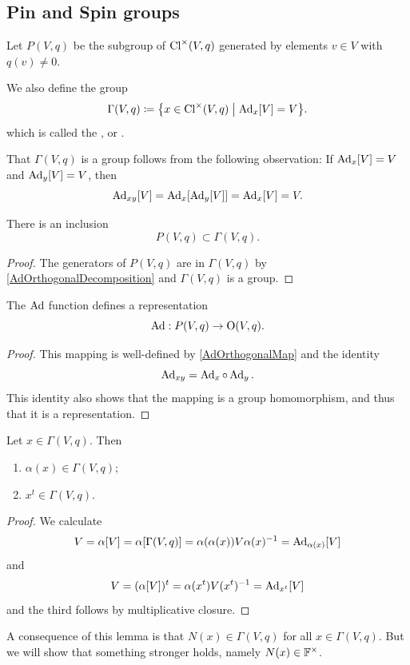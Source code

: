 \subsection{Pin and Spin groups}
\begin{definition}
Let $P(V,q)$ be the subgroup of $\operatorname{Cl}^\times(V,q)$ generated by elements $v\in V$ with $q(v)\neq 0$.

We also define the group
\[ \Gamma(V,q) \defeq \setbuilder{x\in\Cl^\times(V,q)}{\Ad_x[V] = V}. \]
which is called the ,  or .
\end{definition}
That $\Gamma(V,q)$ is a group follows from the following observation: If $\operatorname{Ad}_x[V]=V$ and $\operatorname{Ad}_y[V]=V$, then
\[ \operatorname{Ad}_{xy}[V] = \operatorname{Ad}_x[\operatorname{Ad}_y[V]] = \operatorname{Ad}_x[V] = V. \]


\begin{lemma} \label{PsubgroupVpreserving}
There is an inclusion
\[ P(V,q) \subset \Gamma(V,q). \]
\end{lemma}
\begin{proof}
The generators of $P(V,q)$ are in $\Gamma(V,q)$ by \ref{AdOrthogonalDecomposition} and $\Gamma(V,q)$ is a group.
\end{proof}

\begin{lemma}
The $\operatorname{Ad}$ function defines a representation
\[ \operatorname{Ad}: P(V,q) \to \operatorname{O}(V,q). \]
\end{lemma}
\begin{proof}
This mapping is well-defined by \ref{AdOrthogonalMap} and the identity
\[ \operatorname{Ad}_{xy} = \operatorname{Ad}_x\circ \operatorname{Ad}_y. \]
This identity also shows that the mapping is a group homomorphism, and thus that it is a representation.
\end{proof}

\begin{lemma}
Let $x\in \Gamma(V,q)$. Then
\begin{enumerate}
\item $\alpha(x)\in \Gamma(V,q)$;
\item $x^t\in \Gamma(V,q)$.
\end{enumerate}
\end{lemma}
\begin{proof}
We calculate
\[ V = \alpha[V] = \alpha[\Gamma(V,q)] = \alpha(\alpha(x)) V \alpha(x)^{-1} = \operatorname{Ad}_{\alpha(x)}[V] \]
and
\[ V = (\alpha[V])^t = \alpha(x^t) V (x^t)^{-1} = \operatorname{Ad}_{x^t}[V] \]
and the third follows by multiplicative closure.
\end{proof}
A consequence of this lemma is that $N(x)\in \Gamma(V,q)$ for all $x\in \Gamma(V,q)$. But we will show that something stronger holds, namely $N(x)\in\mathbb{F}^\times$.

